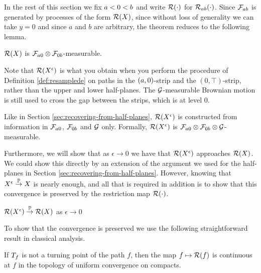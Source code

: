 {In the rest of this
section we fix $a < 0 < b$ and write $\mathcal{R}(\cdot)$ for
$\mathcal{R}_{{a}{b}}(\cdot)$.
Since $\mathcal{F}_{a b}$ is generated by processes of the form $\mathcal{R}(X)$, since
without loss of generality we can take $y=0$ and since $a$ and $b$ are arbitrary, 
the theorem reduces to the following lemma.

\begin{lemma}
  $\mathcal{R}(X)$ is $\mathcal{F}_{a 0} \otimes
  \mathcal{F}_{0 b}$-measurable.
\end{lemma}

\newcommand{\Resresamplede}{\Res{\resamplede}}
\newcommand{\Ressampled}{\Res{\sampled}}

Note that $\Resresamplede$ is what you obtain when you perform the
procedure of Definition \ref{def:resamplede} on paths in the
$(a,0)$-strip and the $(0,\top)$-strip, rather than the upper and lower
half-planes.  The $\mathcal{G}$-measurable Brownian motion is still used to
cross the gap between the strips, which is at level $0$.

Like in Section \ref{sec:recovering-from-half-planes}, $\Resresamplede$
is constructed from information in $\mathcal{F}_{a 0}$,
$\mathcal{F}_{0 b}$ and $\mathcal{G}$ only.
Formally,
  $\mathcal{R}(X^{\epsilon})$ is $\mathcal{F}_{a 0} \otimes \mathcal{F}_{0 b}
  \otimes \mathcal{G}$-measurable.

Furthermore, we will show that as $\epsilon \to 0$ we have that
$\Resresamplede$ approaches $\Ressampled$.  We could show this
directly by an extension of the argument we used for the half-planes
in Section \ref{sec:recovering-from-half-planes}.  However, knowing that
$X^{\epsilon} \overset{\mathbb{P}}\to X$ is nearly enough, and all that is required
in addition is to show that this convergence is preserved by the
restriction map $\mathcal{R}(\cdot)$.

\begin{lemma}
    \label{lem:resamplede-to-sampled-strip}
    $\mathcal{R}(X^{\epsilon}) \overset{\mathbb{P}}\to \mathcal{R}(X)$ as $\epsilon \to 0$
\end{lemma}

To show that the convergence is preserved we use the following
straightforward result in classical analysis.

\newcommand{\stripleavetimenotturningpoint}[1]{$\stripleavetime{#1}$ is
  not a turning point of the path $#1$}

\begin{lemma}
  \label{lem:Res-continuous-ae}
  If \stripleavetimenotturningpoint{f},
  then the map $f \mapsto \mathcal{R}(f)$ is continuous at $f$ in the
  topology of uniform convergence on compacts.
\end{lemma}

}

